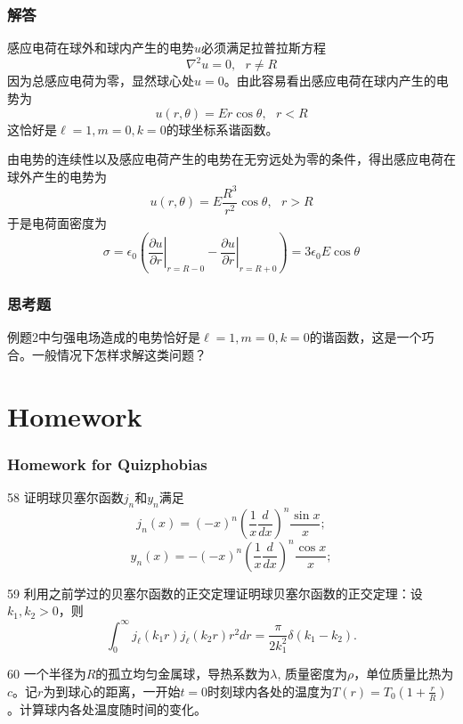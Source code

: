 \documentclass[CJK]{beamer}
\begin{document}
\begin{frame}
\frametitle{解答}


感应电荷在球外和球内产生的电势$u$必须满足拉普拉斯方程
$$\nabla^2 u = 0,\ \ \ r\ne R$$
因为总感应电荷为零，显然球心处$u=0$。由此容易看出感应电荷在球内产生的电势为
$$ u(r, \theta) = E r \cos\theta,\ \ \ r<R $$
这恰好是$\ell =1, m = 0, k=0$的球坐标系谐函数。

由电势的连续性以及感应电荷产生的电势在无穷远处为零的条件，得出感应电荷在球外产生的电势为
$$ u(r, \theta) = E \frac{R^3}{r^2}\cos\theta, \ \ \ r>R $$
于是电荷面密度为
$$\sigma =  \epsilon_0\left(\left.\frac{\partial u}{\partial r}\right\vert_{r=R-0}-\left.\frac{\partial u}{\partial r}\right\vert_{r=R+0}\right) = 3\epsilon_0E\cos\theta $$ 

\end{frame}



\begin{frame}
\frametitle{思考题}



例题2中匀强电场造成的电势恰好是$\ell = 1, m = 0, k=0$的谐函数，这是一个巧合。一般情况下怎样求解这类问题？

\end{frame}




  


\section{Homework}

\begin{frame}
\frametitle{Homework for Quizphobias}
\bitem
\item[58]{证明球贝塞尔函数$j_n$和$y_n$满足
  $$ j_n(x) = (-x)^n\left(\frac{1}{x}\frac{d}{dx}\right)^n\frac{\sin x}{x}; $$
  $$ y_n(x) = -(-x)^n\left(\frac{1}{x}\frac{d}{dx}\right)^n\frac{\cos x}{x}; $$}
\item[59]{利用之前学过的贝塞尔函数的正交定理证明球贝塞尔函数的正交定理：设$k_1, k_2>0$，则
  $$\int_0^\infty j_{\ell}(k_1r)j_{\ell}(k_2r) r^2 dr = \frac{\pi}{2k_1^2} \delta(k_1-k_2).$$}
\item[60]{一个半径为$R$的孤立均匀金属球，导热系数为$\lambda$, 质量密度为$\rho$，单位质量比热为$c$。记$r$为到球心的距离，一开始$t=0$时刻球内各处的温度为$T(r) = T_0\left(1+\frac{r}{R}\right)$。计算球内各处温度随时间的变化。}  
\eitem
\end{frame}

\ech
\end{document}
